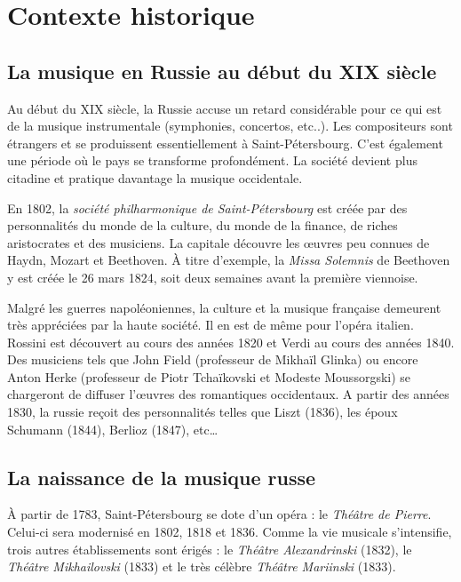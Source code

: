 
\chapter{Contexte historique}

\section{La musique en Russie au début du XIX\ieme{} siècle}

Au début du XIX\ieme{} siècle, la Russie accuse un retard considérable pour ce qui est de la musique instrumentale (symphonies, concertos, etc..). Les compositeurs sont étrangers et se produissent essentiellement à Saint-Pétersbourg. C'est également une période où le pays se transforme profondément. La société devient plus citadine et pratique davantage la musique occidentale.

En 1802, la \emph{société philharmonique de Saint-Pétersbourg} est créée par des personnalités du monde de la culture, du monde de la finance, de riches aristocrates et des musiciens. La capitale découvre les œuvres peu connues de Haydn, Mozart et Beethoven. À titre d'exemple, la \emph{Missa Solemnis} de Beethoven y est créée le 26 mars 1824, soit deux semaines avant la première viennoise.

Malgré les guerres napoléoniennes, la culture et la musique française demeurent très appréciées par la haute société. Il en est de même pour l'opéra italien. Rossini est découvert au cours des années 1820 et Verdi au cours des années 1840. Des musiciens tels que John Field (professeur de Mikhaïl Glinka) ou encore Anton Herke (professeur de Piotr Tchaïkovski et Modeste Moussorgski) se chargeront de diffuser l'œuvres des romantiques occidentaux. A partir des années 1830, la russie reçoit des personnalités telles que Liszt (1836), les époux Schumann (1844), Berlioz (1847), etc\dots

\section{La naissance de la musique russe}

À partir de 1783, Saint-Pétersbourg se dote d'un opéra : le \emph{Théâtre de Pierre}. Celui-ci sera modernisé en 1802, 1818 et 1836. Comme la vie musicale s'intensifie, trois autres établissements sont érigés : le \emph{Théâtre Alexandrinski} (1832), le \emph{Théâtre Mikhailovski} (1833) et le très célèbre \emph{Théâtre Mariinski} (1833).

